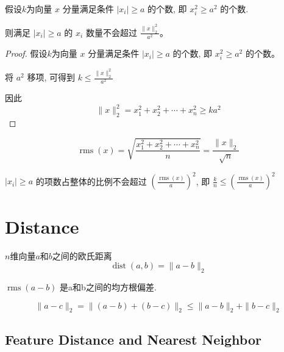     

   
\begin{theorem}
    假设$k$为向量 $ x $ 分量满足条件 $ \left|x_{i}\right| \geq a $ 的个数, 即 $ x_{i}^{2} \geq a^{2} $ 的个数. 

    则满足 $ \left|x_{i}\right| \geq a $ 的 $ x_{i} $ 数量不会超过 $ \frac{\| x \|_{2}^{2}}{a^{2}} $。
\end{theorem}

\begin{proof}
    假设$k$为向量 $ x $ 分量满足条件 $ \left|x_{i}\right| \geq a $ 的个数, 即 $ x_{i}^{2} \geq a^{2} $ 的个数。
    
    将 $ a^{2} $ 移项, 可得到 $ k \leq \frac{\|x\|_{2}^{2}}{a^{2}} $

    因此$$ \|x\|_{2}^{2}=x_{1}^{2}+x_{2}^{2}+\cdots+x_{n}^{2} \geq k a^{2} $$
\end{proof}

\begin{corollary}
    $$ \operatorname{rms}(x)=\sqrt{\frac{x_{1}^{2}+x_{2}^{2}+\cdots+x_{n}^{2}}{n}}=\frac{\|x\|_{2}}{\sqrt{n}} $$

    $ \left|x_{i}\right| \geq a $ 的项数占整体的比例不会超过 $ \left(\frac{\operatorname{rms}(x)}{a}\right)^{2} $, 即 $ \frac{k}{n} \leq\left(\frac{\operatorname{rms}(x)}{a}\right)^{2} $
\end{corollary}

\section{Distance}

\begin{definition}
    $n$维向量$a$和$b$之间的欧氏距离
    $$ \operatorname{dist}(a, b)=\|a-b\|_{2} $$
\end{definition}

\begin{definition}
    $ \operatorname{rms}(a-b) $ 是a和b之间的均方根偏差.
\end{definition}

\begin{theorem}
    $$ \|a-c\|_{2}=\|(a-b)+(b-c)\|_{2} \leq\|a-b\|_{2}+\|b-c\|_{2} $$
\end{theorem}

\subsection{Feature Distance and Nearest Neighbor}

